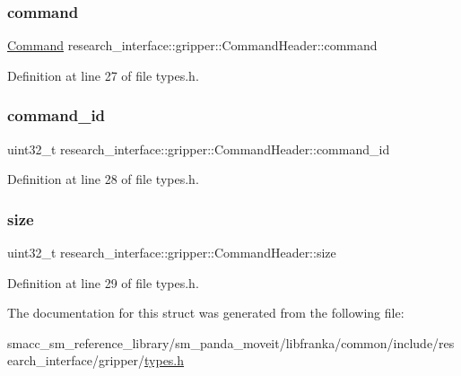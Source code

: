 \subsubsection{\texorpdfstring{command}{command}}
{\footnotesize\ttfamily \hyperlink{namespaceresearch__interface_1_1gripper_adeda0327764e059bac8a5f967ce41590}{Command} research\+\_\+interface\+::gripper\+::\+Command\+Header\+::command}



Definition at line 27 of file types.\+h.

\mbox{\label{structresearch__interface_1_1gripper_1_1CommandHeader_aa1260b5ed470826d10c918e849dc98b7}} 
\subsubsection{\texorpdfstring{command\+\_\+id}{command\_id}}
{\footnotesize\ttfamily uint32\+\_\+t research\+\_\+interface\+::gripper\+::\+Command\+Header\+::command\+\_\+id}



Definition at line 28 of file types.\+h.

\mbox{\label{structresearch__interface_1_1gripper_1_1CommandHeader_a0f7845a3260620f694f65982da4b6610}} 
\subsubsection{\texorpdfstring{size}{size}}
{\footnotesize\ttfamily uint32\+\_\+t research\+\_\+interface\+::gripper\+::\+Command\+Header\+::size}



Definition at line 29 of file types.\+h.



The documentation for this struct was generated from the following file\+:\begin{DoxyCompactItemize}
\item 
smacc\+\_\+sm\+\_\+reference\+\_\+library/sm\+\_\+panda\+\_\+moveit/libfranka/common/include/research\+\_\+interface/gripper/\hyperlink{types_8h}{types.\+h}\end{DoxyCompactItemize}
